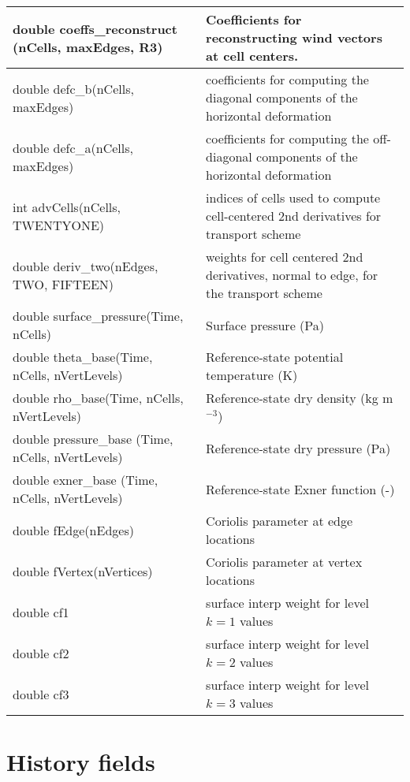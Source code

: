 {\begin{longtable}{|p{2.5in} |p{3.75in}|}
        double coeffs\_reconstruct \hfil\break (nCells, maxEdges, R3) &   Coefficients for reconstructing wind vectors at cell centers. \\ \hline
        double defc\_b(nCells, maxEdges)                 & coefficients for computing the diagonal components \hfil\break of the horizontal deformation \\ \hline
        double defc\_a(nCells, maxEdges)                 &  coefficients for computing the off-diagonal components \hfil\break of the horizontal deformation\\ \hline
        int advCells(nCells, TWENTYONE)                  &indices of cells used to compute cell-centered 2nd derivatives for transport scheme \\ \hline
        double \hfil\break deriv\_two(nEdges, TWO, FIFTEEN)          & weights for cell centered 2nd derivatives, normal to edge, for the transport scheme \\ \hline
        double surface\_pressure(Time, nCells)           & Surface pressure (Pa) \\ \hline
        double \hfil\break theta\_base(Time, nCells, nVertLevels)    & Reference-state potential temperature (K) \\ \hline
        double \hfil\break rho\_base(Time, nCells, nVertLevels)      & Reference-state dry density (kg m$^{-3}$) \\ \hline
        double pressure\_base \hfil\break (Time, nCells, nVertLevels) & Reference-state dry pressure (Pa) \\ \hline
        double exner\_base \hfil\break (Time, nCells, nVertLevels)    & Reference-state Exner function (-) \\ \hline
        double fEdge(nEdges)         &  Coriolis parameter at edge locations \\ \hline
        double fVertex(nVertices)    &  Coriolis parameter at vertex locations \\ \hline
        double cf1                   &  surface interp weight for level $k=1$ values \\ \hline
        double cf2                   &  surface interp weight for level $k=2$ values \\ \hline
        double cf3                   &  surface interp weight for level $k=3$ values \\ \hline
\end{longtable}
}
        
\section{History fields}

